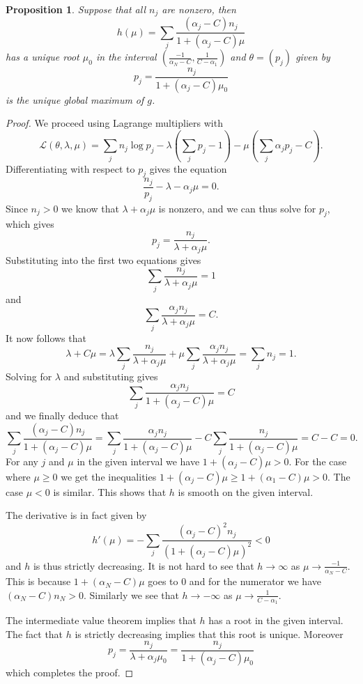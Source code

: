 \documentclass{article}
\theoremstyle{plain}
\newtheorem{proposition} {\bf Proposition} [section]
\theoremstyle{definition}
\begin{document}
\begin{proposition}\label{uniqueroot}
	Suppose that all $n_j$ are nonzero, then $$h(\mu)=\sum_j \frac{(\alpha_j-C)n_j}
	{1+(\alpha_j-C)\mu}$$
	has a unique root $\mu_0$ in the interval $\left(\frac{-1}{\alpha_N-C},\frac{1}
	{C-\alpha_1}\right)$
	and $\theta=(p_j)$ given by $$p_j=\frac{n_j}{1+(\alpha_j-C)\mu_0}$$
	is the unique global maximum of $g$.
\end{proposition}
\begin{proof}
	We proceed using Lagrange multipliers with $$\mathcal{L(\theta,\lambda,\mu)}=\sum_j
	n_j \log p_j-\lambda\left(\sum_j p_j-1\right)-\mu\left(\sum_j \alpha_jp_j-C\right).$$
	Differentiating with respect to $p_j$ gives the equation $$\frac{n_j}{p_j}-\lambda-
	\alpha_j\mu=0.$$ Since $n_j>0$ we know that $\lambda+\alpha_j\mu$ is nonzero, and
	we can thus solve for $p_j$, which gives
	$$p_j=\frac{n_j}{\lambda+\alpha_j\mu}.$$ Substituting into the first two equations
	gives $$\sum_j\frac{n_j}{\lambda+\alpha_j\mu}=1$$ and
	$$\sum_j\frac{\alpha_jn_j}{\lambda+\alpha_j\mu}=C.$$ It now follows that $$\lambda+C\mu=
	\lambda\sum_j\frac{n_j}{\lambda+\alpha_j\mu}+\mu\sum_j\frac{\alpha_jn_j}{\lambda+
	\alpha_j\mu}=\sum_j n_j=1.$$ Solving for $\lambda$ and substituting gives
	$$\sum_j\frac{\alpha_jn_j}{1+(\alpha_j-C)\mu}=C$$ and we finally deduce that
	$$\sum_j\frac{(\alpha_j-C)n_j}{1+(\alpha_j-C)\mu}=\sum_j\frac{\alpha_jn_j}{1+(\alpha_j
	-C)\mu}-C\sum_j\frac{n_j}{1+(\alpha_j-C)\mu}=C-C=0.$$
	For any $j$ and $\mu$ in the given interval we have $1+(\alpha_j-C)\mu>0$. For the
	case where $\mu\geq0$ we get the inequalities $1+(\alpha_j-C)\mu\geq1+(\alpha_1-C)\mu>0$.
	The case $\mu<0$ is similar. This shows that $h$ is smooth on the given interval.

	The derivative is in fact given by $$h'(\mu)=-\sum_j \frac{(\alpha_j-C)^2n_j}{(1+
	(\alpha_j-C)\mu)^2}<0$$ and $h$ is thus strictly decreasing. It is not hard to
	see that $h\to\infty$ as $\mu\to\frac{-1}{\alpha_N-C}$. This is because
	$1+(\alpha_N-C)\mu$ goes to $0$ and for the numerator we have $(\alpha_N-C)n_N>0$.
	Similarly we see that $h\to-\infty$ as $\mu\to\frac1{C-\alpha_1}$.

	The intermediate value theorem implies that $h$ has a root in the given interval.
	The fact that $h$ is strictly decreasing implies that this root is unique.
	Moreover $$p_j=\frac{n_j}{\lambda+\alpha_j\mu_0}=\frac{n_j}{1+(\alpha_j-
	C)\mu_0}$$ which completes the proof.
\end{proof}
\end{document}
